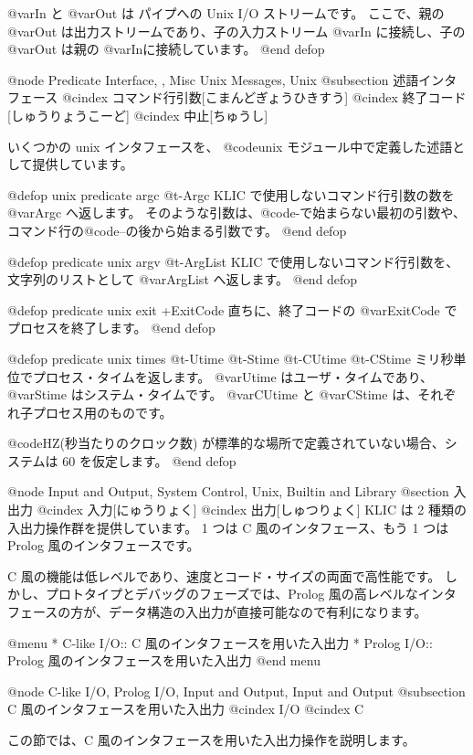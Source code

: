 {{{{@var{In} と @var{Out} は パイプへの Unix I/O ストリームです。
ここで、親の @var{Out} は出力ストリームであり、子の入力ストリーム @var{In} に接続し、子の @var{Out} は親の @var{In}に接続しています。
@end defop

@node Predicate Interface,  , Misc Unix Messages, Unix
@subsection 述語インタフェース
@cindex コマンド行引数[こまんどぎょうひきすう]
@cindex 終了コード[しゅうりょうこーど]
@cindex 中止[ちゅうし]

いくつかの unix インタフェースを、 @code{unix} モジュール中で定義した述語として提供しています。

@defop {unix} {predicate} argc @t{-}Argc
KLIC で使用しないコマンド行引数の数を @var{Argc} へ返します。
そのような引数は、@code{-}で始まらない最初の引数や、コマンド行の@code{--}の後から始まる引数です。
@end defop

@defop {predicate} {unix} argv @t{-}ArgList
KLIC で使用しないコマンド行引数を、文字列のリストとして @var{ArgList} へ返します。
@end defop

@defop {predicate} {unix} exit +ExitCode
直ちに、終了コードの @var{ExitCode} でプロセスを終了します。
@end defop

@defop {predicate} {unix} times @t{-}Utime @t{-}Stime @t{-}CUtime @t{-}CStime
ミリ秒単位でプロセス・タイムを返します。
@var{Utime} はユーザ・タイムであり、@var{Stime} はシステム・タイムです。
@var{CUtime} と @var{CStime} は、それぞれ子プロセス用のものです。

@code{HZ}(秒当たりのクロック数) が標準的な場所で定義されていない場合、システムは 60 を仮定します。
@end defop

@node Input and Output, System Control, Unix, Builtin and Library
@section 入出力
@cindex 入力[にゅうりょく]
@cindex 出力[しゅつりょく]
KLIC は 2 種類の入出力操作群を提供しています。
1 つは C 風のインタフェース、もう 1 つは Prolog 風のインタフェースです。

C 風の機能は低レベルであり、速度とコード・サイズの両面で高性能です。
しかし、プロトタイプとデバッグのフェーズでは、Prolog 風の高レベルなインタフェースの方が、データ構造の入出力が直接可能なので有利になります。

@menu
* C-like I/O::                  C 風のインタフェースを用いた入出力
* Prolog I/O::                  Prolog 風のインタフェースを用いた入出力
@end menu

@node C-like I/O, Prolog I/O, Input and Output, Input and Output
@subsection C 風のインタフェースを用いた入出力
@cindex I/O
@cindex C

この節では、C 風のインタフェースを用いた入出力操作を説明します。

}}}}
